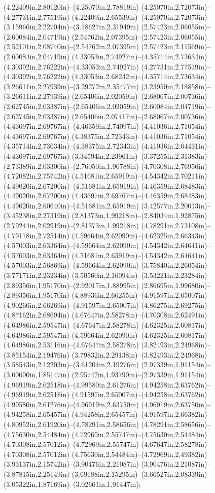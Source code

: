 (4.22409in,2.80120in)--(4.25070in,2.78819in) (4.25070in,2.72073in)--(4.27731in,2.77519in) (4.22409in,2.65539in)--(4.25070in,2.72073in) (3.15966in,2.22704in)--(3.18627in,2.31949in) (2.57423in,2.06055in)--(2.60084in,2.04719in) (2.54762in,2.07395in)--(2.57423in,2.06055in) (2.52101in,2.08740in)--(2.54762in,2.07395in) (2.57423in,2.11569in)--(2.60084in,2.04719in) (4.33053in,2.74927in)--(4.35714in,2.73634in) (4.30392in,2.76222in)--(4.33053in,2.74927in) (4.27731in,2.77519in)--(4.30392in,2.76222in) (4.33053in,2.68242in)--(4.35714in,2.73634in) (3.26611in,2.27939in)--(3.29272in,2.35477in) (3.23950in,2.18858in)--(3.26611in,2.27939in) (2.65406in,2.02059in)--(2.68067in,2.00736in) (2.62745in,2.03387in)--(2.65406in,2.02059in) (2.60084in,2.04719in)--(2.62745in,2.03387in) (2.65406in,2.07417in)--(2.68067in,2.00736in) (4.43697in,2.69767in)--(4.46359in,2.74097in) (4.41036in,2.71054in)--(4.43697in,2.69767in) (4.38375in,2.72343in)--(4.41036in,2.71054in) (4.35714in,2.73634in)--(4.38375in,2.72343in) (4.41036in,2.64431in)--(4.43697in,2.69767in) (3.34594in,2.23961in)--(3.37255in,2.31383in) (2.73389in,2.03300in)--(2.76050in,1.96788in) (4.70308in,2.76956in)--(4.72082in,2.75742in) (4.51681in,2.65919in)--(4.54342in,2.70211in) (4.49020in,2.67200in)--(4.51681in,2.65919in) (4.46359in,2.68483in)--(4.49020in,2.67200in) (4.43697in,2.69767in)--(4.46359in,2.68483in) (4.49020in,2.60640in)--(4.51681in,2.65919in) (3.42577in,2.20013in)--(3.45238in,2.27319in) (2.81373in,1.99218in)--(2.84034in,1.92875in) (2.79244in,2.02919in)--(2.81373in,1.99218in) (4.78291in,2.73108in)--(4.79178in,2.72514in) (4.59664in,2.62090in)--(4.62325in,2.66343in) (4.57003in,2.63364in)--(4.59664in,2.62090in) (4.54342in,2.64641in)--(4.57003in,2.63364in) (4.51681in,2.65919in)--(4.54342in,2.64641in) (4.57003in,2.56869in)--(4.59664in,2.62090in) (3.75840in,2.26054in)--(3.77171in,2.23234in) (3.50560in,2.16094in)--(3.53221in,2.23284in) (2.89356in,1.95170in)--(2.92017in,1.88995in) (2.86695in,1.99680in)--(2.89356in,1.95170in) (4.88936in,2.66255in)--(4.91597in,2.65007in) (4.90266in,2.66269in)--(4.91597in,2.65007in) (4.86275in,2.69275in)--(4.87162in,2.68694in) (4.67647in,2.58278in)--(4.70308in,2.62491in) (4.64986in,2.59547in)--(4.67647in,2.58278in) (4.62325in,2.60817in)--(4.64986in,2.59547in) (4.59664in,2.62090in)--(4.62325in,2.60817in) (4.64986in,2.53116in)--(4.67647in,2.58278in) (3.82493in,2.24968in)--(3.85154in,2.19476in) (3.79832in,2.29138in)--(3.82493in,2.24968in) (3.58543in,2.12203in)--(3.61204in,2.19276in) (2.97339in,1.91154in)--(3.00000in,1.85147in) (2.95742in,1.93790in)--(2.97339in,1.91154in) (4.96919in,2.62518in)--(4.99580in,2.61276in) (4.94258in,2.63762in)--(4.96919in,2.62518in) (4.91597in,2.65007in)--(4.94258in,2.63762in) (4.99580in,2.61276in)--(4.96919in,2.63750in) (4.96919in,2.63750in)--(4.94258in,2.65457in) (4.94258in,2.65457in)--(4.91597in,2.66382in) (4.80952in,2.61920in)--(4.78291in,2.58656in) (4.78291in,2.58656in)--(4.75630in,2.54484in) (4.72969in,2.55747in)--(4.75630in,2.54484in) (4.70308in,2.57012in)--(4.72969in,2.55747in) (4.67647in,2.58278in)--(4.70308in,2.57012in) (4.75630in,2.54484in)--(4.72969in,2.49382in) (3.93137in,2.15742in)--(3.90476in,2.21087in) (3.90476in,2.21087in)--(3.87815in,2.25149in) (3.69188in,2.15295in)--(3.66527in,2.08339in) (3.05322in,1.87169in)--(3.02661in,1.91447in);
